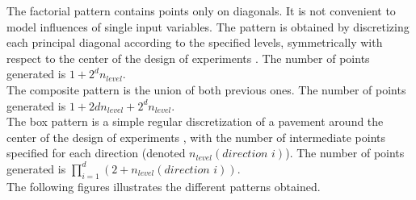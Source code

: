 {      The factorial pattern contains points only on diagonals. It is not convenient to model influences of single input variables. The pattern is obtained by discretizing each principal diagonal according to the specified levels, symmetrically with respect to the center of the design of experiments . The number of points generated is $1 + 2^dn_{level}$.\\

      The composite pattern is the union of both previous ones. The number of points generated is $1 + 2dn_{level} + 2^dn_{level}$.\\

      The box pattern is a simple regular discretization of a pavement around the center of the design of experiments , with the number of intermediate points specified for each direction (denoted $n_{level}(direction \, \, i)$). The number of points generated is $\displaystyle \prod_{i=1}^{d} (2+n_{level}(direction \, \, i))$.\\

      The following figures illustrates the different patterns obtained.

}
